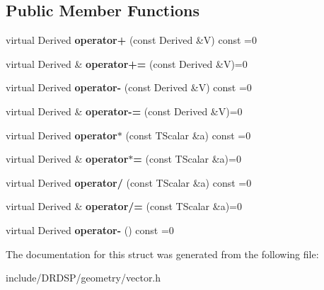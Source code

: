 \subsection*{Public Member Functions}
\begin{DoxyCompactItemize}
\item 
\hypertarget{struct_d_r_d_s_p_1_1_vector_ae0414720f2f7df0f93db48ec06a5bffa}{virtual Derived {\bfseries operator+} (const Derived \&V) const =0}\label{struct_d_r_d_s_p_1_1_vector_ae0414720f2f7df0f93db48ec06a5bffa}

\item 
\hypertarget{struct_d_r_d_s_p_1_1_vector_af834765f99b0fb9bc831232130e65e9a}{virtual Derived \& {\bfseries operator+=} (const Derived \&V)=0}\label{struct_d_r_d_s_p_1_1_vector_af834765f99b0fb9bc831232130e65e9a}

\item 
\hypertarget{struct_d_r_d_s_p_1_1_vector_a8420652d7d12d600cfdf8b93c2d097f7}{virtual Derived {\bfseries operator-\/} (const Derived \&V) const =0}\label{struct_d_r_d_s_p_1_1_vector_a8420652d7d12d600cfdf8b93c2d097f7}

\item 
\hypertarget{struct_d_r_d_s_p_1_1_vector_afdbe13820fd8449fa9db2b5efdc6c63c}{virtual Derived \& {\bfseries operator-\/=} (const Derived \&V)=0}\label{struct_d_r_d_s_p_1_1_vector_afdbe13820fd8449fa9db2b5efdc6c63c}

\item 
\hypertarget{struct_d_r_d_s_p_1_1_vector_a18d15ba8f747ec0e8056aa009a755647}{virtual Derived {\bfseries operator$\ast$} (const T\-Scalar \&a) const =0}\label{struct_d_r_d_s_p_1_1_vector_a18d15ba8f747ec0e8056aa009a755647}

\item 
\hypertarget{struct_d_r_d_s_p_1_1_vector_a49fd2816abf9072c70f8f1ba99d596d2}{virtual Derived \& {\bfseries operator$\ast$=} (const T\-Scalar \&a)=0}\label{struct_d_r_d_s_p_1_1_vector_a49fd2816abf9072c70f8f1ba99d596d2}

\item 
\hypertarget{struct_d_r_d_s_p_1_1_vector_a8615194b57aad6762166047c28568175}{virtual Derived {\bfseries operator/} (const T\-Scalar \&a) const =0}\label{struct_d_r_d_s_p_1_1_vector_a8615194b57aad6762166047c28568175}

\item 
\hypertarget{struct_d_r_d_s_p_1_1_vector_af56f733484ef09cef2f7c439f754e636}{virtual Derived \& {\bfseries operator/=} (const T\-Scalar \&a)=0}\label{struct_d_r_d_s_p_1_1_vector_af56f733484ef09cef2f7c439f754e636}

\item 
\hypertarget{struct_d_r_d_s_p_1_1_vector_a237f4841398cd0822f2438b390864ee6}{virtual Derived {\bfseries operator-\/} () const =0}\label{struct_d_r_d_s_p_1_1_vector_a237f4841398cd0822f2438b390864ee6}

\end{DoxyCompactItemize}


The documentation for this struct was generated from the following file\-:\begin{DoxyCompactItemize}
\item 
include/\-D\-R\-D\-S\-P/geometry/vector.\-h\end{DoxyCompactItemize}
